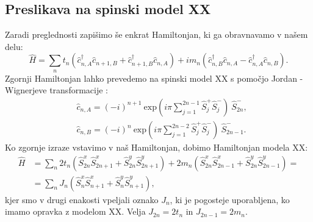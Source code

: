\begin{appendices}
\chapter{Preslikava na spinski model XX}
Zaradi preglednosti zapišimo še enkrat Hamiltonjan, ki ga obravnavamo v našem delu:
\begin{equation}
\hat{H} = \sum_{n} t_n \left(\hat{c}_{n,A}^\dagger \hat{c}_{n+1, B} + \hat{c}^\dagger_{n+1,B} \hat{c}_{n,A} \right) + im_n \left( \hat{c}^\dagger_{n,B} \hat{c}_{n,A} - \hat{c}^\dagger_{n,A}\hat{c}_{n,B}   \right).
\end{equation}
Zgornji Hamiltonjan lahko prevedemo na spinski model XX s pomočjo Jordan - Wignerjeve transformacije \cite{mondragon}:
\begin{align}
&\hat{c}_{n,A} = (-i)^{n+1}\  \mathrm{exp}(i \pi \sum_{j=1}^{2n-1} \hat{S}_j^+ \hat{S}_j^-)\ \hat{S}_{2n}^-,\\
&\hat{c}_{n,B} = (-i)^n \ \mathrm{exp}(i \pi \sum_{j=1}^{2n-2} \hat{S}_j^+ \hat{S}_j^-) \ \hat{S}^-_{2n-1}.
\end{align}
Ko zgornje izraze vstavimo v naš Hamiltonjan, dobimo Hamiltonjan modela XX:
\begin{align}
\hat{H} &= \sum_n 2 t_n ( \hat{S}^x_{2n} \hat{S}^x_{2n+1} + \hat{S}^y_{2n} \hat{S}^y_{2n+1}) + 2m_n (\hat{S}^x_{2n} \hat{S}^x_{2n-1} + \hat{S}^y_{2n} \hat{S}^y_{2n-1}) = \\
&= \sum_n J_n (\hat{S}^x_n \hat{S}^x_{n+1} + \hat{S}^y_n \hat{S}^y_{n+1}),
\end{align}
kjer smo v drugi enakosti vpeljali oznako $J_n$, ki je pogosteje uporabljena, ko imamo opravka z modelom XX. Velja $J_{2n} = 2 t_n$ in $J_{2n-1} = 2m_n$.
 
\end{appendices}

\cleardoublepage
\printindex







